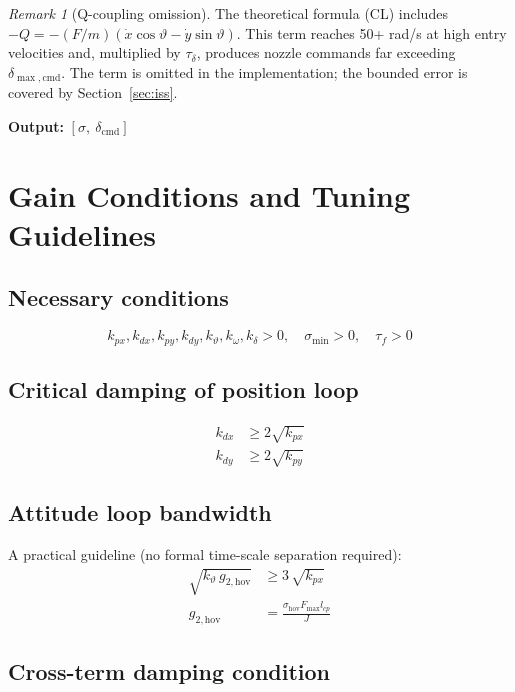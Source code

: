\documentclass[11pt,a4paper]{article}
\theoremstyle{plain}
\theoremstyle{remark}
\newtheorem{remark}{Remark}[section]
\newcommand{\vth}{\vartheta}
\newcommand{\dcmd}{\delta_{\mathrm{cmd}}}
\newcommand{\Fmax}{F_{\max}}
\begin{document}
\begin{remark}[Q-coupling omission]
The theoretical formula (CL) includes $-Q = -(F/m)(\dot x\cos\vth - \dot y\sin\vth)$. This term reaches 50+ rad/s at high entry velocities and, multiplied by $\tau_\delta$, produces nozzle commands far exceeding $\delta_{\max,\mathrm{cmd}}$. The term is omitted in the implementation; the bounded error is covered by Section~\ref{sec:iss}.
\end{remark}

\textbf{Output:} $[\sigma,\ \dcmd]$

\section{Gain Conditions and Tuning Guidelines}

\subsection*{Necessary conditions}
\[
  k_{px}, k_{dx}, k_{py}, k_{dy}, k_\vth, k_\omega, k_\delta > 0, \quad \sigma_{\min} > 0, \quad \tau_f > 0
\]

\subsection*{Critical damping of position loop}
\begin{align}
  k_{dx} &\geq 2\sqrt{k_{px}} \\
  k_{dy} &\geq 2\sqrt{k_{py}}
\end{align}

\subsection*{Attitude loop bandwidth}

A practical guideline (no formal time-scale separation required):
\begin{align}
  \sqrt{k_\vth\, g_{2,\mathrm{hov}}} &\geq 3\,\sqrt{k_{px}} \\
  g_{2,\mathrm{hov}} &= \frac{\sigma_{\mathrm{hov}} \Fmax l_{cp}}{J}
\end{align}

\subsection*{Cross-term damping condition}
\end{document}
